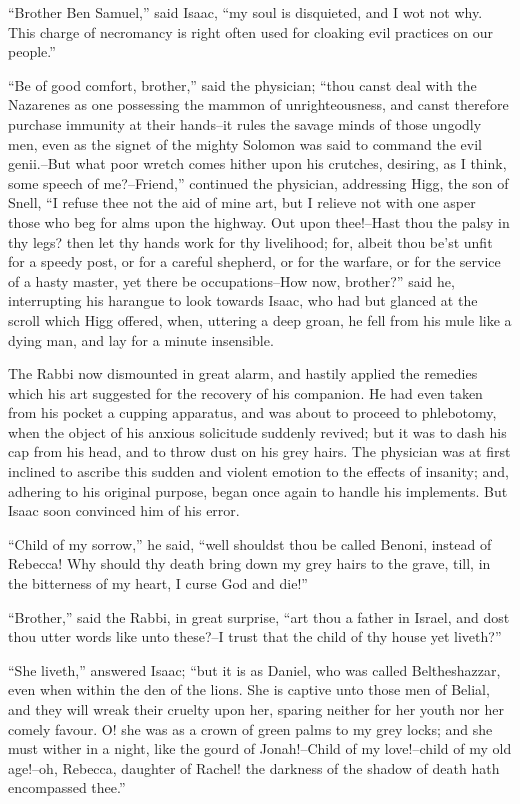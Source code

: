 ``Brother Ben Samuel,'' said Isaac, ``my soul is disquieted, and I wot
not why. This charge of necromancy is right often used for cloaking evil
practices on our people.''

``Be of good comfort, brother,'' said the physician; ``thou canst deal
with the Nazarenes as one possessing the mammon of unrighteousness, and
canst therefore purchase immunity at their hands--it rules the savage
minds of those ungodly men, even as the signet of the mighty Solomon was
said to command the evil genii.--But what poor wretch comes hither upon
his crutches, desiring, as I think, some speech of me?--Friend,''
continued the physician, addressing Higg, the son of Snell, ``I refuse
thee not the aid of mine art, but I relieve not with one asper those who
beg for alms upon the highway. Out upon thee!--Hast thou the palsy in
thy legs? then let thy hands work for thy livelihood; for, albeit thou
be'st unfit for a speedy post, or for a careful shepherd, or for the
warfare, or for the service of a hasty master, yet there be
occupations--How now, brother?'' said he, interrupting his harangue to
look towards Isaac, who had but glanced at the scroll which Higg
offered, when, uttering a deep groan, he fell from his mule like a dying
man, and lay for a minute insensible.

The Rabbi now dismounted in great alarm, and hastily applied the
remedies which his art suggested for the recovery of his companion. He
had even taken from his pocket a cupping apparatus, and was about to
proceed to phlebotomy, when the object of his anxious solicitude
suddenly revived; but it was to dash his cap from his head, and to throw
dust on his grey hairs. The physician was at first inclined to ascribe
this sudden and violent emotion to the effects of insanity; and,
adhering to his original purpose, began once again to handle his
implements. But Isaac soon convinced him of his error.

``Child of my sorrow,'' he said, ``well shouldst thou be called Benoni,
instead of Rebecca! Why should thy death bring down my grey hairs to the
grave, till, in the bitterness of my heart, I curse God and die!''

``Brother,'' said the Rabbi, in great surprise, ``art thou a father in
Israel, and dost thou utter words like unto these?--I trust that the
child of thy house yet liveth?''

``She liveth,'' answered Isaac; ``but it is as Daniel, who was called
Beltheshazzar, even when within the den of the lions. She is captive
unto those men of Belial, and they will wreak their cruelty upon her,
sparing neither for her youth nor her comely favour. O! she was as a
crown of green palms to my grey locks; and she must wither in a night,
like the gourd of Jonah!--Child of my love!--child of my old age!--oh,
Rebecca, daughter of Rachel! the darkness of the shadow of death hath
encompassed thee.''

